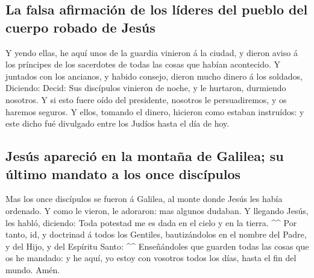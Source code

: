 \hypertarget{la-falsa-afirmaciuxf3n-de-los-luxedderes-del-pueblo-del-cuerpo-robado-de-jesuxfas}{%
\subsection{La falsa afirmación de los líderes del pueblo del cuerpo
robado de
Jesús}\label{la-falsa-afirmaciuxf3n-de-los-luxedderes-del-pueblo-del-cuerpo-robado-de-jesuxfas}}

 Y yendo ellas, he aquí unos de la guardia vinieron á la
ciudad, y dieron aviso á los príncipes de los sacerdotes de todas las
cosas que habían acontecido.  Y juntados con los ancianos,
y habido consejo, dieron mucho dinero á los soldados, 
Diciendo: Decid: Sus discípulos vinieron de noche, y le hurtaron,
durmiendo nosotros.  Y si esto fuere oído del presidente,
nosotros le persuadiremos, y os haremos seguros.  Y ellos,
tomando el dinero, hicieron como estaban instruídos: y este dicho fué
divulgado entre los Judíos hasta el día de hoy.

\hypertarget{jesuxfas-apareciuxf3-en-la-montauxf1a-de-galilea-su-uxfaltimo-mandato-a-los-once-discuxedpulos}{%
\subsection{Jesús apareció en la montaña de Galilea; su último mandato a
los once
discípulos}\label{jesuxfas-apareciuxf3-en-la-montauxf1a-de-galilea-su-uxfaltimo-mandato-a-los-once-discuxedpulos}}

 Mas los once discípulos se fueron á Galilea, al monte
donde Jesús les había ordenado.  Y como le vieron, le
adoraron: mas algunos dudaban.  Y llegando Jesús, les
habló, diciendo: Toda potestad me es dada en el cielo y en la tierra.
\^{}\^{}  Por tanto, id, y doctrinad á todos los Gentiles,
bautizándolos en el nombre del Padre, y del Hijo, y del Espíritu Santo:
\^{}\^{}  Enseñándoles que guarden todas las cosas que os
he mandado: y he aquí, yo estoy con vosotros todos los días, hasta el
fin del mundo. Amén.
